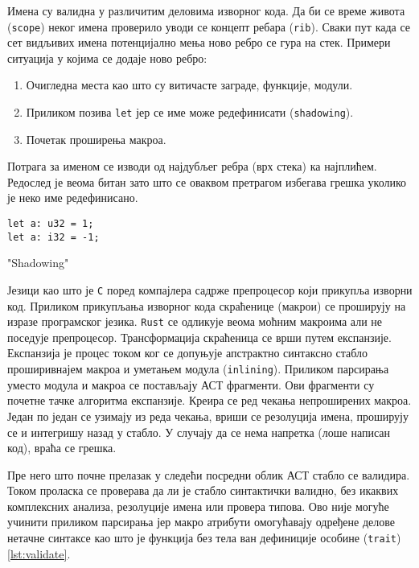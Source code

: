Имена су валидна у различитим деловима изворног кода. Да би се 
време живота (\verb|scope|) неког имена проверило уводи се концепт ребара (\verb|rib|). Сваки пут када се 
сет видљивих имена потенцијално мења ново ребро се гура на стек. Примери ситуација у којима се додаје 
ново ребро:

\begin{enumerate}
    \item Очигледна места као што су витичасте заграде, функције, модули.
    \item Приликом позива \verb|let| јер се име може редефинисати (\verb|shadowing|).
    \item Почетак проширења макроа. 
\end{enumerate}
Потрага за именом се изводи од најдубљег ребра (врх стека) ка најплићем. 
Редослед је веома битан зато што се оваквом претрагом избегава грешка 
уколико је неко име редефинисано.

\begin{listing}[H]
\begin{verbatim}
let a: u32 = 1;
let a: i32 = -1;
\end{verbatim}
\caption{"Shadowing"}
\label{lst:shadowing}
\end{listing}

Језици као што је \verb|C| поред компајлера садрже препроцесор који прикупља изворни код. 
Приликом прикупљања изворног кода скраћенице (макрои) се проширују на изразе програмског језика. 
\verb|Rust| се одликује веома моћним макроима али не поседује препроцесор. Трансформација скраћеница се врши 
путем експанзије.  Експанзија је процес током ког се допуњује апстрактно синтаксно стабло
проширивнајем макроа и уметањем модула (\verb|inlining|). Приликом парсирања уместо 
модула и макроа се постављају АСТ фрагменти. Ови фрагменти су почетне тачке алгоритма експанзије.
Креира се ред чекања непроширених макроа. Један по један се узимају из реда чекања, вриши се резолуција имена,
проширују се и интегришу назад у стабло. У случају да се нема напретка (лоше написан код), враћа се грешка.

Пре него што почне прелазак у следећи посредни облик АСТ стабло се валидира. 
Током проласка се проверава да ли је стабло синтактички валидно, без икаквих комплексних анализа,
резолуције имена или провера типова. Ово није могуће учинити приликом парсирања јер макро атрибути 
омогућавају одређене делове нетачне синтаксе као што је функција без тела ван дефиниције особине (\verb|trait|) \ref{lst:validate}.

